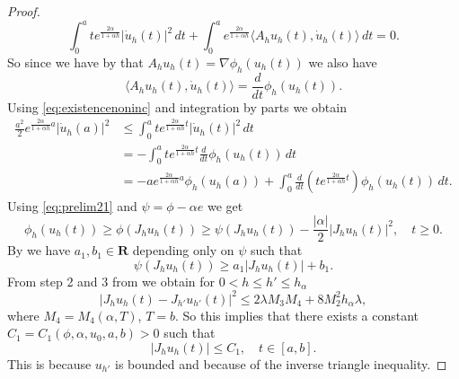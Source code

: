 \documentclass[a4paper,11pt, leqno]{scrreprt} %
\renewcommand{\leq}{\leqslant}
\renewcommand{\leq}{\leqslant}
\renewcommand{\geq}{\geqslant}
\newcommand{\R}{\mathbf R}
\theoremstyle{change}
\theoremstyle{nonumberplain}
\newtheorem{proof}{Proof}
\begin{document}
\begin{proof}
\begin{equation*}
    \int_0^a t e^{\frac{2\alpha}{1 + \alpha h}} |\dot u_h(t)|^2 \, dt
    + \int_0^a e^{\frac{2\alpha}{1 + \alpha h}} \langle A_h u_h(t),
    \dot u_h(t) \rangle \, dt = 0.
  \end{equation*}
  So since we have by  that $A_h u_h(t) = \nabla
  \phi_h(u_h(t))$ we also have
  \begin{equation*}
    \langle A_h u_h(t), \dot u_h(t) \rangle = \frac{d}{dt} \phi_h(u_h(t)).
  \end{equation*}
  Using \eqref{eq:existencenoninc} and integration by parts we obtain
  \begin{equation*}
    \begin{split}
          \frac{a^2}2 e^{\frac{2\alpha}{1 + \alpha h}a} |\dot
          u_h(a)|^2 &\leq \int_0^a t e^{\frac{2\alpha}{1 + \alpha h}t}
          |\dot u_h(t)|^2 \, dt\\
          &= -\int_0^a t e^{\frac{2\alpha}{1 + \alpha h}t}
          \frac{d}{dt} \phi_h(u_h(t)) \, dt\\
          &=-a e^{\frac{2\alpha}{1 + \alpha h}a} \phi_h(u_h(a)) +
          \int_0^a \frac{d}{dt} (t e^{\frac{2\alpha}{1 + \alpha h} t})
          \phi_h(u_h(t)) \, dt.
    \end{split}
  \end{equation*}
  Using \eqref{eq:prelim21} and $\psi = \phi - \alpha e$ we get
  \begin{equation*}
    \phi_h(u_h(t)) \geq \phi(J_h u_h(t)) \geq \psi(J_h u_h(t)) -
    \frac{|\alpha|}{2} |J_h u_h(t)|^2, \quad t \geq 0.
  \end{equation*}
  By  we have $a_1, b_1 \in \R$ depending only on
  $\psi$ such that
  \begin{equation*}
    \psi(J_h u_h(t)) \geq a_1 |J_h u_h(t)| + b_1.
  \end{equation*}
  From step 2 and 3 from  we obtain for $0 < h
  \leq h' \leq h_\alpha$
  \begin{equation*}
    |J_h u_h(t) - J_{h'} u_{h'}(t)|^2 \leq 2 \lambda M_3 M_4 + 8 M_2^2
    h_\alpha \lambda,
  \end{equation*}
  where $M_4 = M_4(\alpha, T)$, $T = b$. So this implies that there
  exists a constant\\ $C_1 = C_1(\phi, \alpha, u_0, a, b) > 0$ such that
  \begin{equation}
    \label{eq:qcsemigroupboundjh}
    |J_h u_h(t)| \leq C_1, \quad t \in [a,b].
  \end{equation}
  This is because $u_{h'}$ is bounded and because of the inverse
  triangle inequality.


\end{proof}
\end{document}
